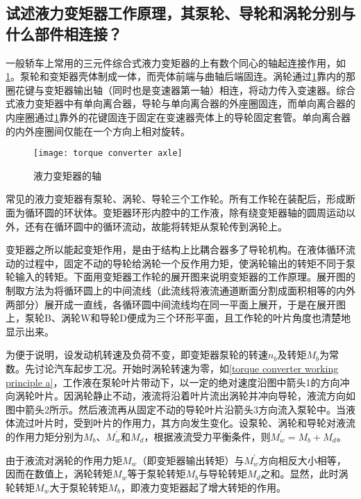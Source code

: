 \documentclass[UTF8]{ctexart}
\numberwithin{figure}{section}
\numberwithin{table}{section}
\begin{document}
\subsection{试述液力变矩器工作原理，其泵轮、导轮和涡轮分别与什么部件相连接？}

一般轿车上常用的三元件综合式液力变矩器的上有数个同心的轴起连接作用，如\cref{torque converter axle}。泵轮和变矩器壳体制成一体，而壳体前端与曲轴后端固连。涡轮通过\cref{torque converter axle}靠内的那圈花键与变矩器输出轴（同时也是变速器第一轴）相连，将动力传入变速器。综合式液力变矩器中有单向离合器，导轮与单向离合器的外座圈固连，而单向离合器的内座圈通过\cref{torque converter axle}靠外的花键固连于固定在变速器壳体上的导轮固定套管。单向离合器的内外座圈间仅能在一个方向上相对旋转。

\begin{figure}[htbp]
	\centering
	\begin{minipage}[b]{0.5\textwidth}
		\centering
		\texttt{[image: torque converter axle]}
		\caption{液力变矩器的轴}
		\label{torque converter axle}
	\end{minipage}
\end{figure}

常见的液力变矩器有泵轮、涡轮、导轮三个工作轮。所有工作轮在装配后，形成断面为循环圆的环状体。变矩器环形内腔中的工作液，除有绕变矩器轴的圆周运动以外，还有在循环圆中的循环流动，故能将转矩从泵轮传到涡轮上。

变矩器之所以能起变矩作用，是由于结构上比耦合器多了导轮机构。在液体循环流动的过程中，固定不动的导轮给涡轮一个反作用力矩，使涡轮输出的转矩不同于泵轮输入的转矩。下面用变矩器工作轮的展开图来说明变矩器的工作原理。展开图的制取方法为将循环圆上的中间流线（此流线将液流通道断面分割成面积相等的内外两部分）展开成一直线，各循环圆中间流线均在同一平面上展开，于是在展开图上，泵轮B、涡轮W和导轮D便成为三个环形平面，且工作轮的叶片角度也清楚地显示出来。

为便于说明，设发动机转速及负荷不变，即变矩器泵轮的转速$n_b$及转矩$M_b$为常数。先讨论汽车起步工况。开始时涡轮转速为零，如\cref{torque converter working principle a}，工作液在泵轮叶片带动下，以一定的绝对速度沿图中箭头1的方向冲向涡轮叶片。因涡轮静止不动，液流将沿着叶片流出涡轮并冲向导轮，液流方向如图中箭头2所示。然后液流再从固定不动的导轮叶片沿箭头3方向流入泵轮中。当液体流过叶片时，受到叶片的作用力，其方向发生变化。设泵轮、涡轮和导轮对液流的作用力矩分别为$M_b$、$M_w^{\prime}$和$M_d$，根据液流受力平衡条件，则$M_w^{\prime} = M_b+M_d$。

由于液流对涡轮的作用力矩$M_w$（即变矩器输出转矩）与$M_w^{\prime}$方向相反大小相等，因而在数值上，涡轮转矩$M_w$等于泵轮转矩$M_b$与导轮转矩$M_d$之和。显然，此时涡轮转矩$M_w$大于泵轮转矩$M_b$，即液力变矩器起了增大转矩的作用。
\end{document}
